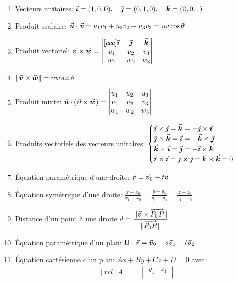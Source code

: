 \begin{adjmulticols}{1}{0in}{-2in}
\begin{enumerate}
\item Vecteurs unitaires: $\vec{\boldsymbol{\imath}} = (1, 0, 0), \quad 
	\vec{\boldsymbol{\jmath}} = (0, 1, 0), \quad
	\vec{\boldsymbol{k}} = (0, 0, 1)$ 
\item Produit scalaire: $\vec{\boldsymbol{u}}\cdot\vec{\boldsymbol{v}} = u_1 v_1 + u_2 v_2 + u_3 v_3 = uv\cos\theta$
\item Produit vectoriel: $\displaystyle \vec{\boldsymbol{v}}\times \vec{\boldsymbol{w}} =
	  \begin{vmatrix}[ccc]
	\vec{\boldsymbol{\imath}} &\vec{\boldsymbol{\jmath}} &\vec{\boldsymbol{k}} \\
	 v_1 & v_2 & v_3 \\
	 w_1 & w_2 & w_3
	 \end{vmatrix}$
\item $\lVert\vec{\boldsymbol{v}}\times \vec{\boldsymbol{w}}\rVert = vw\sin\theta$
\item Produit mixte: $\displaystyle \vec{\boldsymbol{u}}\cdot (\vec{\boldsymbol{v}} \times \vec{\boldsymbol{w}}) = \begin{vmatrix}
	 u_1 & u_2 & u_3 \\
	 v_1 & v_2 & v_3 \\
	 w_1 & w_2 & w_3
	\end{vmatrix}$ 
\item Produits vectoriels des vecteurs unitaires: $\displaystyle \begin{cases}
	\vec{\boldsymbol{\imath}}\times\vec{\boldsymbol{\jmath}}=\vec{\boldsymbol{k}} = -\vec{\boldsymbol{\jmath}}\times\vec{\boldsymbol{\imath}}\\
	\vec{\boldsymbol{\jmath}}\times\vec{\boldsymbol{k}}=\vec{\boldsymbol{\imath}} = -\vec{\boldsymbol{k}}\times\vec{\boldsymbol{\jmath}}\\
	\vec{\boldsymbol{k}}\times\vec{\boldsymbol{\imath}}=\vec{\boldsymbol{\jmath}} = -\vec{\boldsymbol{\imath}}\times\vec{\boldsymbol{k}}\\
\vec{\boldsymbol{\imath}}\times\vec{\boldsymbol{\imath}}=\vec{\boldsymbol{\jmath}}\times\vec{\boldsymbol{\jmath}}=\vec{\boldsymbol{k}}\times\vec{\boldsymbol{k}}=0\end{cases} $
\item Équation paramétrique d'une droite: $\vec{\boldsymbol{r}} = \vec{\boldsymbol{v}}_0 + t \vec{\boldsymbol{v}}$
\item Équation symétrique d'une droite: 
      $\displaystyle \frac{x-x_0}{x_1-x_0} =\frac{y-y_0}{y_1-y_0} =\frac{z-z_0}{z_1-z_0}$
\item Distance d'un point à une droite $\displaystyle
	d = \frac{\lVert\vec{\boldsymbol{v}} \times \overrightarrow{P_0 P}\rVert}{\lVert\overrightarrow{P_0 P}\rVert}$
\item Équation paramétrique d'un plan: $\Pi: \vec{\boldsymbol{r}} = \vec{\boldsymbol{v}}_0 + s\vec{\boldsymbol{v}}_1 + t\vec{\boldsymbol{v}}_2 $
\item Équation cartésienne d'un plan: 
   $Ax + By + Cz + D = 0$ avec \[
   \begin{matrix}[rcl]
   A &=& \begin{vmatrix}
   y_1 & z_1\\

\end{vmatrix}
\end{matrix}\]
\end{enumerate}
\end{adjmulticols}
